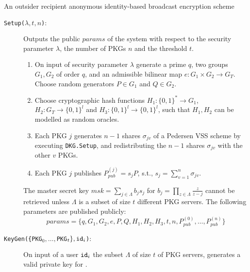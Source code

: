 \thispagestyle{empty}

\makeatletter
\setlength{\headsep}{-10pt}
\makeatother

\begin{algorithm}[H]
\caption{An outsider recipient anonymous identity-based broadcast encryption scheme}
\label{alg:our_scheme}

\begin{description}
    \item[\texttt{Setup($\lambda, t, n$)}:] Outputs the public $params$ of the system with respect to the security parameter $\lambda$, the number of PKGs $n$ and the threshold $t$.
    \begin{enumerate}
        \item On input of security parameter $\lambda$ generate a prime $q$, two groups $G_1, G_2$ of order $q$, and an admissible bilinear map $e: G_1 \times G_2 \rightarrow G_T$. Choose random generators $P \in G_1$ and $Q \in G_2$. 
    
        \item Choose cryptographic hash functions $H_1: \{ 0,1 \}^{*} \rightarrow G_1$, ${H_2: G_T \rightarrow \{ 0,1 \}^{l}}$ and $H_3: \{ 0, 1 \}^{l} \rightarrow \{ 0,1 \}^{l}$, such that $H_1, H_2$ can be modelled as random oracles.
        
        \item Each PKG $j$ generates $n-1$ shares $\sigma_{jv}$ of a Pedersen VSS scheme by executing \texttt{DKG.Setup}, and redistributing the $n-1$ shares $\sigma_{jv}$ with the other $v$ PKGs.

        \item Each PKG $j$ publishes $P_{pub}^{(j)} = s_j P$, s.t., $s_j=\sum_{v=1}^n \sigma_{jv}$.
    \end{enumerate}
    
    The master secret key $msk = \sum_{j \in \Lambda} b_j s_j$ for $b_j = \prod_{z \in \Lambda} \frac{z}{z-j}$ cannot be retrieved unless $\Lambda$ is a subset of size $t$ different PKG servers. The following parameters are published publicly:
    \begin{equation*}
    params = \{ q, G_1, G_2, e, P, Q, H_1, H_2, H_3, t, n, P_{pub}^{(0)}, \ldots, P_{pub}^{(n)} \}
    \end{equation*}

    \item[\texttt{KeyGen(\{PKG$_0,\ldots,$PKG$_t\}, \mathtt{id}_{i}$)}:] On input of a user $\mathtt{id}_{i}$ the subset $\Lambda$ of size $t$ of PKG servers, generates a valid private key for . 
    

\end{description}
\end{algorithm}
